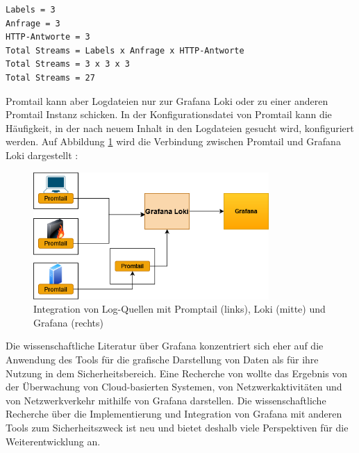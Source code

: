 {
\begin{Verbatim}[commandchars=\\\{\},frame=single]
Labels = 3
Anfrage = 3
HTTP-Antworte = 3
Total Streams = Labels x Anfrage x HTTP-Antworte
Total Streams = 3 x 3 x 3
Total Streams = 27
\end{Verbatim}
}

Promtail kann aber Logdateien nur zur Grafana Loki oder zu einer anderen Promtail Instanz schicken. In der Konfigurationsdatei von Promtail kann die Häufigkeit, in der nach neuem Inhalt in den Logdateien gesucht wird, konfiguriert werden. Auf Abbildung \ref{fig:Integration_Loki_Promtail_Grafana} wird die Verbindung zwischen Promtail und Grafana Loki dargestellt \citep{Grafana_Logs}:


\begin{figure}[H]
   \centering
   \includegraphics[width=0.8\textwidth]{assets/Promtail.png}
   \caption[Integration von Log-Quellen mit Promptail, Loki und Grafana]
   {Integration von Log-Quellen mit Promptail (links), Loki (mitte) und Grafana (rechts)}
   \label{fig:Integration_Loki_Promtail_Grafana}
   \centering
\end{figure}

Die wissenschaftliche Literatur über Grafana konzentriert sich eher auf die Anwendung des Tools für die grafische Darstellung von Daten als für ihre Nutzung in dem Sicherheitsbereich. Eine Recherche von \cite{Manases_grafananetwork} wollte das Ergebnis von der Überwachung von Cloud-basierten Systemen, von Netzwerkaktivitäten und von Netzwerkverkehr mithilfe von Grafana darstellen.
Die wissenschaftliche Recherche über die Implementierung und Integration von Grafana mit anderen Tools zum Sicherheitszweck ist neu und bietet deshalb viele Perspektiven für die Weiterentwicklung an.

